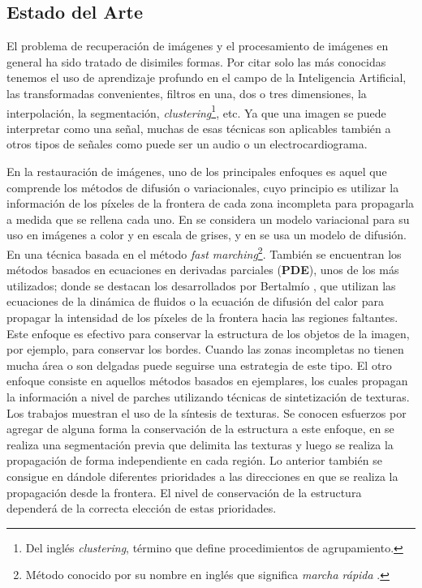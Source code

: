 \begin{introduction}
\section*{Estado del Arte}

El problema de recuperaci\'on de im\'agenes y el procesamiento de imágenes en general ha sido tratado de disimiles formas. Por citar solo las m\'as conocidas tenemos el uso de aprendizaje profundo en el campo de la Inteligencia Artificial, las transformadas convenientes, filtros en una, dos o tres dimensiones, la interpolaci\'on, la segmentaci\'on, \textit{clustering}\footnote{Del ingl\'es \textit{clustering}, t\'ermino que define procedimientos de agrupamiento.}, etc. Ya que una imagen se puede interpretar como una señal, muchas de esas t\'ecnicas son aplicables tambi\'en a otros tipos de señales como puede ser un audio o un electrocardiograma.

En la restauraci\'on de im\'agenes, uno de los principales enfoques es aquel que comprende los m\'etodos de difusión o variacionales, cuyo principio es utilizar la informaci\'on de los p\'ixeles de la frontera de cada zona incompleta para propagarla a medida que se rellena cada uno. En \cite{ballester2001variational} se considera un modelo variacional para su uso en im\'agenes a color y en escala de grises, y en \cite{chan2001nontexture} se usa un modelo de difusión. En \cite{telea2004image} una t\'ecnica basada en el m\'etodo \textit{fast marching}\footnote{M\'etodo conocido por su nombre en ingl\'es que significa \textit{marcha r\'apida} \cite{telea2004image}.}. También se encuentran los métodos basados en ecuaciones en derivadas parciales (\textbf{PDE}), unos de los m\'as utilizados; donde se destacan los desarrollados por Bertalmío \cite{bertalmio2001navier,bertalmio2000image}, que utilizan las ecuaciones de la dinámica de fluidos o la ecuación de difusión del calor para propagar la intensidad de los píxeles de la frontera hacia las regiones faltantes. Este enfoque es efectivo para conservar la estructura de los objetos de la imagen, por ejemplo, para conservar los bordes. Cuando las zonas incompletas no tienen mucha área o son delgadas puede seguirse una estrategia de este tipo. El otro enfoque consiste en aquellos m\'etodos basados en ejemplares, los cuales propagan la informaci\'on a nivel de parches utilizando t\'ecnicas de sintetizaci\'on de texturas. Los trabajos \cite{ashikhmin2001synthesizing,garber1981computational,liang2001real} muestran el uso de la s\'intesis de texturas. Se conocen esfuerzos por agregar de alguna forma la conservaci\'on de la estructura a este enfoque, en \cite{li2014image} se realiza una segmentaci\'on previa que delimita las texturas y luego se realiza la propagaci\'on de forma independiente en cada regi\'on. Lo anterior tambi\'en se consigue en \cite{criminisi2003object, wang2011image} d\'andole diferentes prioridades a las direcciones en que se realiza la propagaci\'on desde la frontera. El nivel de conservaci\'on de la estructura depender\'a de la correcta elecci\'on de estas prioridades.


\end{introduction}
